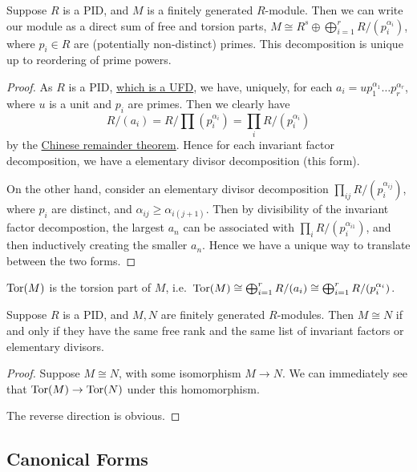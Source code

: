 \begin{theorem}\label{thm:structure-divisor}
    Suppose \(R\) is a PID,
    and \(M\) is a finitely generated \(R\)-module.
    Then we can write our module as a direct sum of free and torsion parts,
    \(M \cong R^s \oplus \bigoplus_{i=1}^r R/(p_i^{\alpha_i})\),
    where \(p_i \in R\) are (potentially non-distinct) primes.
    This decomposition is unique up to reordering of prime powers.
\end{theorem}
\begin{proof}
    As \(R\) is a PID, \hyperref[thm:pid-ufd]{which is a UFD},
    we have, uniquely, for each \(a_i = up_1^{\alpha_1} \hdots p_r^{\alpha_r}\),
    where \(u\) is a unit and \(p_i\) are primes.
    Then we clearly have
    \begin{equation*}
        R/(a_i) = R/\prod (p_i^{\alpha_i})
        = \prod_i R/(p_i^{\alpha_i})
    \end{equation*}
    by the \hyperref[thm:chinese]{Chinese remainder theorem}.
    Hence for each invariant factor decomposition,
    we have a elementary divisor decomposition (this form).

    On the other hand, consider an elementary divisor decomposition
    \(\prod_{ij} R/(p_i^{\alpha_{ij}})\), where \(p_i\) are distinct,
    and \(\alpha_{ij} \geq \alpha_{i(j+1)}\).
    Then by divisibility of the invariant factor decompostion,
    the largest \(a_n\) can be associated with \(\prod_i R/(p_i^{\alpha_{i1}})\),
    and then inductively creating the smaller \(a_n\).
    Hence we have a unique way to translate between the two forms.
\end{proof}

\begin{definition}
    \(\operatorname{Tor}(M)\) is the torsion part of \(M\),
    i.e.\ \(\operatorname{Tor}(M) \cong \bigoplus_{i=1}^r R/(a_i) \cong \bigoplus_{i=1}^r R/(p_i^{\alpha_i})\).
\end{definition}

\begin{theorem}\label{thm:structure-uniqueness}
    Suppose \(R\) is a PID,
    and \(M,N\) are finitely generated \(R\)-modules.
    Then \(M \cong N\) if and only if they have the same free rank
    and the same list of invariant factors or elementary divisors.
\end{theorem}
\begin{proof}
    Suppose \(M \cong N\), with some isomorphism \(M \to N\).
    We can immediately see that \(\operatorname{Tor}(M) \to \operatorname{Tor}(N)\) under this homomorphism.

    The reverse direction is obvious.
\end{proof}

\subsection*{Canonical Forms}
